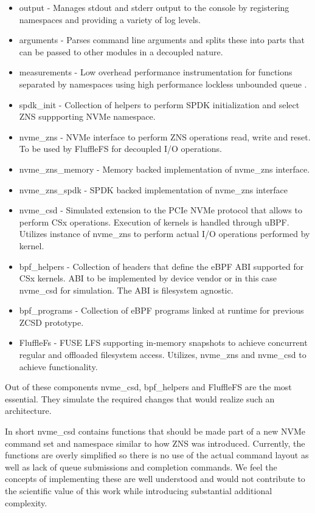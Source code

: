 \begin{itemize}
    \item output - Manages stdout and stderr output to the console by
    registering namespaces and providing a variety of log levels.
    \item arguments - Parses command line arguments and splits these into parts
    that can be passed to other modules in a decoupled nature. 
    \item measurements - Low overhead performance instrumentation for functions
    separated by namespaces using high performance lockless unbounded queue
    \cite{Michael1996SimpleFA}.
    \item spdk\_init - Collection of helpers to perform SPDK initialization and
    select ZNS suppporting NVMe namespace.
    \item nvme\_zns - NVMe interface to perform ZNS operations read, write and
    reset. To be used by FluffleFS for decoupled I/O operations.
    \item nvme\_zns\_memory - Memory backed implementation of nvme\_zns
    interface.
    \item nvme\_zns\_spdk - SPDK backed implementation of nvme\_zns interface
    \item nvme\_csd - Simulated extension to the PCIe NVMe protocol that allows
    to perform CSx operations. Execution of kernels is handled through uBPF.
    Utilizes instance of nvme\_zns to perform actual I/O operations performed by
    kernel.
    \item bpf\_helpers - Collection of headers that define the eBPF ABI
    supported for CSx kernels. ABI to be implemented by device vendor
    or in this case nvme\_csd for simulation. The ABI is filesystem agnostic.
    \item bpf\_programs - Collection of eBPF programs linked at runtime for
    previous ZCSD \cite{lukken2021zcsd} prototype.
    \item FluffleFs - FUSE LFS supporting in-memory snapshots to achieve
    concurrent regular and offloaded filesystem access. Utilizes, nvme\_zns and
    nvme\_csd to achieve functionality.
\end{itemize}

Out of these components nvme\_csd, bpf\_helpers and FluffleFS are the most
essential. They simulate the required changes that would realize such an
architecture.

In short nvme\_csd contains functions that should be made part of a new NVMe
command set and namespace \cite{nvme-command} similar to how ZNS was introduced.
Currently, the functions are overly simplified so there is no use of the actual
command layout as well as lack of queue submissions and completion commands. We
feel the concepts of implementing these are well understood and would not
contribute to the scientific value of this work while introducing substantial
additional complexity.

